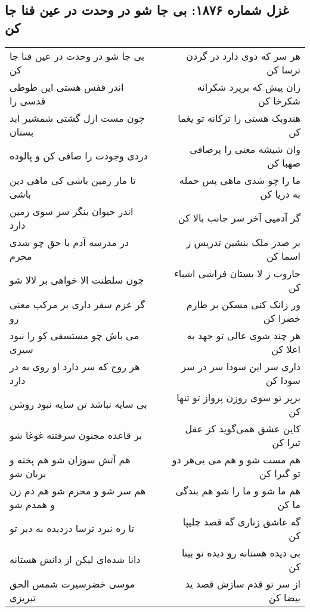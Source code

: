 \begin{center}
\section*{غزل شماره ۱۸۷۶: بی جا شو در وحدت در عین فنا جا کن}
\label{sec:1876}
\begin{longtable}{l p{0.5cm} r}
بی جا شو در وحدت در عین فنا جا کن
&&
هر سر که دوی دارد در گردن ترسا کن
\\
اندر قفس هستی این طوطی قدسی را
&&
زان پیش که برپرد شکرانه شکرخا کن
\\
چون مست ازل گشتی شمشیر ابد بستان
&&
هندوبک هستی را ترکانه تو یغما کن
\\
دردی وجودت را صافی کن و پالوده
&&
وان شیشه معنی را پرصافی صهبا کن
\\
تا مار زمین باشی کی ماهی دین باشی
&&
ما را چو شدی ماهی پس حمله به دریا کن
\\
اندر حیوان بنگر سر سوی زمین دارد
&&
گر آدمیی آخر سر جانب بالا کن
\\
در مدرسه آدم با حق چو شدی محرم
&&
بر صدر ملک بنشین تدریس ز اسما کن
\\
چون سلطنت الا خواهی بر لالا شو
&&
جاروب ز لا بستان فراشی اشیاء کن
\\
گر عزم سفر داری بر مرکب معنی رو
&&
ور زانک کنی مسکن بر طارم خضرا کن
\\
می باش چو مستسقی کو را نبود سیری
&&
هر چند شوی عالی تو جهد به اعلا کن
\\
هر روح که سر دارد او روی به در دارد
&&
داری سر این سودا سر در سر سودا کن
\\
بی سایه نباشد تن سایه نبود روشن
&&
برپر تو سوی روزن پرواز تو تنها کن
\\
بر قاعده مجنون سرفتنه غوغا شو
&&
کاین عشق همی‌گوید کز عقل تبرا کن
\\
هم آتش سوزان شو هم پخته و بریان شو
&&
هم مست شو و هم می بی‌هر دو تو گیرا کن
\\
هم سر شو و محرم شو هم دم زن و همدم شو
&&
هم ما شو و ما را شو هم بندگی ما کن
\\
تا ره نبرد ترسا دزدیده به دیر تو
&&
گه عاشق زناری گه قصد چلیپا کن
\\
دانا شده‌ای لیکن از دانش هستانه
&&
بی دیده هستانه رو دیده تو بینا کن
\\
موسی خضرسیرت شمس الحق تبریزی
&&
از سر تو قدم سازش قصد ید بیضا کن
\\
\end{longtable}
\end{center}
